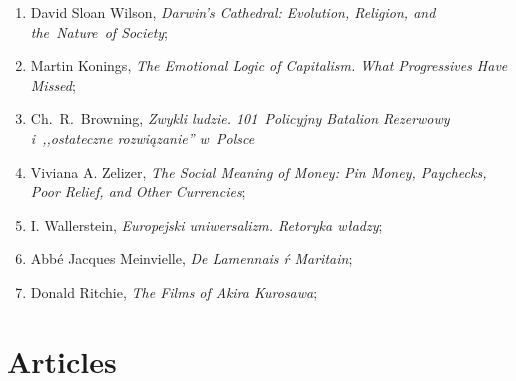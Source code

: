 \documentclass[a4paper,11pt]{article}
\begin{document}
\vspace{\spaceTwo}


\begin{enumerate}
\item David Sloan Wilson, \emph{Darwin's Cathedral: Evolution,
    Religion, and the~Nature~of Society};
\item Martin Konings, \emph{The Emotional Logic of Capitalism. What
    Progressives Have Missed};
\item Ch.~R.~Browning, \emph{Zwykli ludzie. 101~Policyjny Batalion
    Rezerwowy i~,,ostateczne rozwiązanie'' w~Polsce}
\item Viviana A. Zelizer, \emph{The Social Meaning of Money: Pin
    Money, Paychecks, Poor Relief, and Other Currencies};
\item I. Wallerstein, \emph{Europejski uniwersalizm. Retoryka władzy};
\item Abbé Jacques Meinvielle, \emph{De Lamennais ŕ Maritain};
\item Donald Ritchie, \emph{The Films of Akira Kurosawa};
\end{enumerate}










\newpage
\section{Articles}

\vspace{\spaceTwo}
\end{document}
